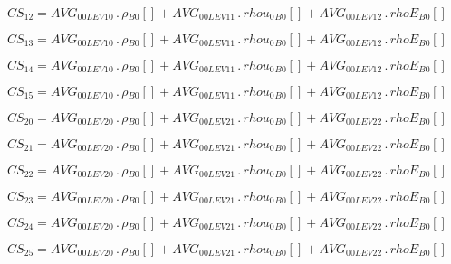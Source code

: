 \documentclass{article}
\begin{document}
\begin{dmath}CS_{12} = AVG_{0 0 LEV 10} \,.\, {\rho{_{B0}}}[{}] + AVG_{0 0 LEV 11} \,.\, {rhou_{0}{_{B0}}}[{}] + AVG_{0 0 LEV 12} \,.\, {rhoE{_{B0}}}[{}]\end{dmath}

\begin{dmath}CS_{13} = AVG_{0 0 LEV 10} \,.\, {\rho{_{B0}}}[{}] + AVG_{0 0 LEV 11} \,.\, {rhou_{0}{_{B0}}}[{}] + AVG_{0 0 LEV 12} \,.\, {rhoE{_{B0}}}[{}]\end{dmath}

\begin{dmath}CS_{14} = AVG_{0 0 LEV 10} \,.\, {\rho{_{B0}}}[{}] + AVG_{0 0 LEV 11} \,.\, {rhou_{0}{_{B0}}}[{}] + AVG_{0 0 LEV 12} \,.\, {rhoE{_{B0}}}[{}]\end{dmath}

\begin{dmath}CS_{15} = AVG_{0 0 LEV 10} \,.\, {\rho{_{B0}}}[{}] + AVG_{0 0 LEV 11} \,.\, {rhou_{0}{_{B0}}}[{}] + AVG_{0 0 LEV 12} \,.\, {rhoE{_{B0}}}[{}]\end{dmath}

\begin{dmath}CS_{20} = AVG_{0 0 LEV 20} \,.\, {\rho{_{B0}}}[{}] + AVG_{0 0 LEV 21} \,.\, {rhou_{0}{_{B0}}}[{}] + AVG_{0 0 LEV 22} \,.\, {rhoE{_{B0}}}[{}]\end{dmath}

\begin{dmath}CS_{21} = AVG_{0 0 LEV 20} \,.\, {\rho{_{B0}}}[{}] + AVG_{0 0 LEV 21} \,.\, {rhou_{0}{_{B0}}}[{}] + AVG_{0 0 LEV 22} \,.\, {rhoE{_{B0}}}[{}]\end{dmath}

\begin{dmath}CS_{22} = AVG_{0 0 LEV 20} \,.\, {\rho{_{B0}}}[{}] + AVG_{0 0 LEV 21} \,.\, {rhou_{0}{_{B0}}}[{}] + AVG_{0 0 LEV 22} \,.\, {rhoE{_{B0}}}[{}]\end{dmath}

\begin{dmath}CS_{23} = AVG_{0 0 LEV 20} \,.\, {\rho{_{B0}}}[{}] + AVG_{0 0 LEV 21} \,.\, {rhou_{0}{_{B0}}}[{}] + AVG_{0 0 LEV 22} \,.\, {rhoE{_{B0}}}[{}]\end{dmath}

\begin{dmath}CS_{24} = AVG_{0 0 LEV 20} \,.\, {\rho{_{B0}}}[{}] + AVG_{0 0 LEV 21} \,.\, {rhou_{0}{_{B0}}}[{}] + AVG_{0 0 LEV 22} \,.\, {rhoE{_{B0}}}[{}]\end{dmath}

\begin{dmath}CS_{25} = AVG_{0 0 LEV 20} \,.\, {\rho{_{B0}}}[{}] + AVG_{0 0 LEV 21} \,.\, {rhou_{0}{_{B0}}}[{}] + AVG_{0 0 LEV 22} \,.\, {rhoE{_{B0}}}[{}]\end{dmath}
\end{document}
